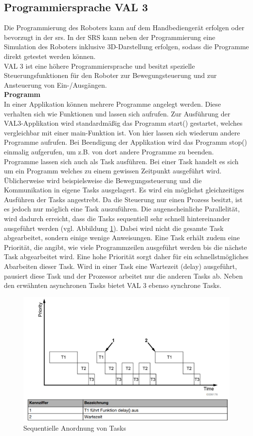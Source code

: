 \documentclass[ a4paper,
                oneside,
                toc=bibliography,
                toc=listof
                ]{scrbook}
\begin{document}
   	\subsection{Programmiersprache VAL 3}
   	Die Programmierung des Roboters kann auf dem Handbediengerät erfolgen oder bevorzugt in der \ac{srs}. In der SRS kann neben der Programmierung eine Simulation des Roboters inklusive 3D-Darstellung erfolgen, sodass die Programme direkt getestet werden können.\\
   	\glqq VAL 3\grqq{} ist eine höhere Programmiersprache und besitzt spezielle Steuerungsfunktionen für den Roboter zur Bewegungsteuerung und zur Ansteuerung von Ein-/Ausgängen. \cite{VAL3}\\
   	\textbf{Programm} \\
   	In einer Applikation können mehrere Programme angelegt werden. Diese verhalten sich wie Funktionen und lassen sich aufrufen. Zur Ausführung der VAL3-Applikation wird standardmäßig das Programm \glqq start()\grqq{} gestartet, welches vergleichbar mit einer \glqq main-Funktion\grqq{} ist. Von hier lassen sich wiederum andere Programme aufrufen. Bei Beendigung der Applikation wird das Programm \glqq stop()\grqq{} einmalig aufgerufen, um z.B. von dort andere Programme zu beenden.\\
   	Programme lassen sich auch als Task ausführen. Bei einer Task handelt es sich um ein Programm welches zu einem gewissen Zeitpunkt ausgeführt wird. Üblicherweise wird beispielsweise die Bewegungssteuerung und die Kommunikation in eigene Tasks ausgelagert. Es wird ein möglichst gleichzeitiges Ausführen der Tasks angestrebt. Da die Steuerung  nur einen Prozess besitzt, ist es jedoch nur möglich eine Task auszuführen. Die augenscheinliche Parallelität, wird dadurch erreicht, dass die Tasks sequentiell sehr schnell hintereinander ausgeführt werden (vgl. Abbildung \ref{fig:tasks}). Dabei wird nicht die gesamte Task abgearbeitet, sondern einige wenige Anweisungen. Eine Task erhält zudem eine Priorität, die angibt, wie viele Programmzeilen ausgeführt werden bis die nächste Task abgearbeitet wird. Eine hohe Priorität sorgt daher für ein schnellstmögliches Abarbeiten dieser Task. Wird in einer Task eine Wartezeit (\glqq delay\grqq) ausgeführt, pausiert diese Task und der Prozessor arbeitet nur die anderen Tasks ab. Neben den erwähnten asynchronen Tasks bietet VAL 3 ebenso synchrone Tasks.
   	\begin{figure}[!ht]
   		\centering
   		\includegraphics[width=0.80\linewidth]{./images/tasks.png}
   		\caption{Sequentielle Anordnung von Tasks \cite{VAL3}} 
   		\label{fig:tasks}
   	\end{figure} \\
\end{document}
